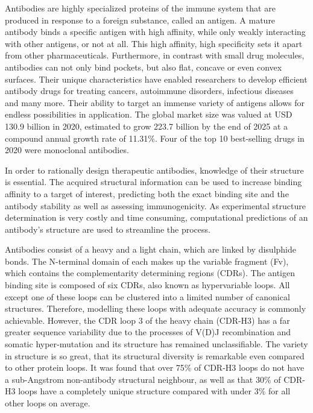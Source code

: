 \documentclass[12pt]{article}
\begin{document}
Antibodies are highly specialized proteins of the immune system that
are produced in response to a foreign substance, called an antigen. A
mature antibody binds a specific antigen with high affinity, while
only weakly interacting with other antigens, or not at all. This high
affinity, high specificity sets it apart from other pharmaceuticals.
Furthermore, in contrast with small drug molecules, antibodies can not
only bind pockets, but also flat, concave or even convex surfaces\cite{Tavers2001}. Their unique characteristics have enabled
researchers to develop efficient antibody drugs for treating cancers,
autoimmune disorders, infectious diseases and many more\cite{Lu2020}.
Their ability to target an immense variety of antigens allows for
endless possibilities in application. The global market size was
valued at USD 130.9 billion in 2020, estimated to grow 223.7 billion
by the end of 2025 at a compound annual growth rate of 11.31\%\cite{market2020}. Four of the top 10 best-selling drugs in 2020 were
monoclonal antibodies\cite{Urquhart2021}.

In order to rationally design therapeutic antibodies, knowledge of
their structure is essential. The acquired structural information can
be used to increase binding affinity to a target of interest,
predicting both the exact binding site and the antibody stability as
well as assessing immunogenicity\cite{Abhinandan2007}. As
experimental structure determination is very costly and time
consuming, computational predictions of an antibody's structure are
used to streamline the process.

Antibodies consist of a heavy and a light chain, which are linked by
disulphide bonds. The N-terminal domain of each makes up the variable
fragment (Fv), which contains the complementarity determining regions
(CDRs). The antigen binding site is composed of six CDRs, also known
as hypervariable loops. All except one of these loops can be clustered
into a limited number of canonical structures. Therefore, modelling
these loops with adequate accuracy is commonly achievable\cite{North2011,Weitzner2015}. However, the CDR loop 3 of the
heavy chain (CDR-H3) has a far greater sequence variability due to the
processes of V(D)J recombination and somatic hyper‐mutation and its
structure has remained unclassifiable\cite{Finn2016}. The variety in
structure is so great, that its structural diversity is remarkable
even compared to other protein loops\cite{Regep2017}. It was found
that over 75\% of CDR-H3 loops do not have a sub-Angstrom non-antibody
structural neighbour, as well as that 30\% of CDR-H3 loops have a
completely unique structure compared with under 3\% for all other
loops on average\cite{Regep2017}.
\end{document}
